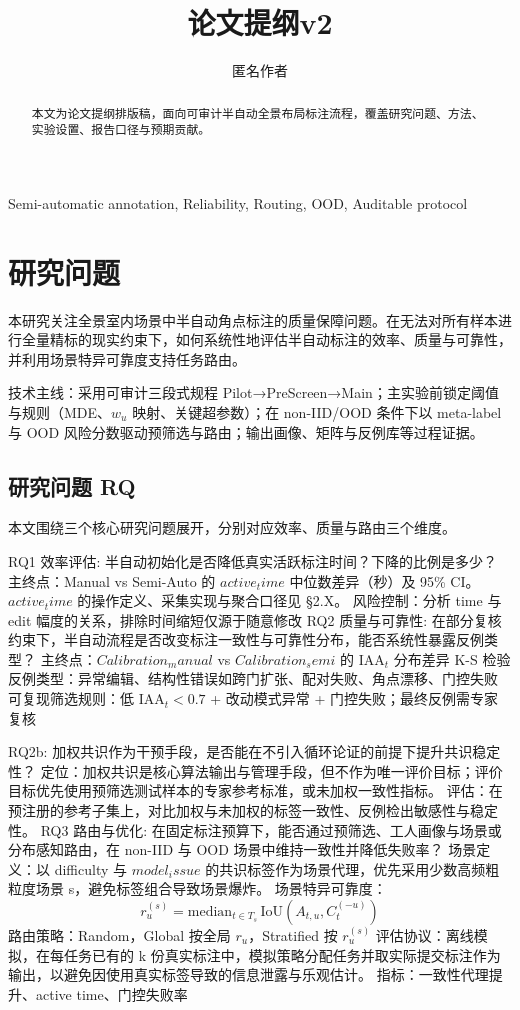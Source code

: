 \documentclass[journal,onecolumn]{IEEEtran}
\title{论文提纲v2}
\author{匿名作者}
\date{}
\begin{document}
\maketitle

\begin{abstract}
本文为论文提纲排版稿，面向可审计半自动全景布局标注流程，覆盖研究问题、方法、实验设置、报告口径与预期贡献。
\end{abstract}

\begin{IEEEkeywords}
Semi-automatic annotation, Reliability, Routing, OOD, Auditable protocol
\end{IEEEkeywords}
\section{研究问题}

本研究关注全景室内场景中半自动角点标注的质量保障问题。在无法对所有样本进行全量精标的现实约束下，如何系统性地评估半自动标注的效率、质量与可靠性，并利用场景特异可靠度支持任务路由。

技术主线：采用可审计三段式规程 Pilot→PreScreen→Main；主实验前锁定阈值与规则（MDE、$w_u$ 映射、关键超参数）；在 non-IID/OOD 条件下以 meta-label 与 OOD 风险分数驱动预筛选与路由；输出画像、矩阵与反例库等过程证据。
\subsection{研究问题 RQ}

本文围绕三个核心研究问题展开，分别对应效率、质量与路由三个维度。

RQ1 效率评估: 半自动初始化是否降低真实活跃标注时间？下降的比例是多少？
主终点：Manual vs Semi-Auto 的 $active_time$ 中位数差异（秒）及 95\% CI。$active_time$ 的操作定义、采集实现与聚合口径见 §2.X。
风险控制：分析 time 与 edit 幅度的关系，排除时间缩短仅源于随意修改
RQ2 质量与可靠性: 在部分复核约束下，半自动流程是否改变标注一致性与可靠性分布，能否系统性暴露反例类型？
主终点：$Calibration_manual$ vs $Calibration_semi$ 的 $\mathrm{IAA}_t$ 分布差异 K-S 检验
反例类型：异常编辑、结构性错误如跨门扩张、配对失败、角点漂移、门控失败
可复现筛选规则：低 $\mathrm{IAA}_t<0.7$ + 改动模式异常 + 门控失败；最终反例需专家复核

RQ2b: 加权共识作为干预手段，是否能在不引入循环论证的前提下提升共识稳定性？
定位：加权共识是核心算法输出与管理手段，但不作为唯一评价目标；评价目标优先使用预筛选测试样本的专家参考标准，或未加权一致性指标。
评估：在预注册的参考子集上，对比加权与未加权的标签一致性、反例检出敏感性与稳定性。
RQ3 路由与优化: 在固定标注预算下，能否通过预筛选、工人画像与场景或分布感知路由，在 non-IID 与 OOD 场景中维持一致性并降低失败率？
场景定义：以 difficulty 与 $model_issue$ 的共识标签作为场景代理，优先采用少数高频粗粒度场景 s，避免标签组合导致场景爆炸。
场景特异可靠度：
\[r_u^{\left(s\right)}=\mathrm{median}_{t\in T_s}\,\mathrm{IoU}\left(A_{t,u},C_t^{\left(-u\right)}\right)\]
路由策略：Random，Global 按全局 $r_u$，Stratified 按 $r_u^{\left(s\right)}$
评估协议：离线模拟，在每任务已有的 k 份真实标注中，模拟策略分配任务并取实际提交标注作为输出，以避免因使用真实标签导致的信息泄露与乐观估计。
指标：一致性代理提升、active time、门控失败率
\end{document}

